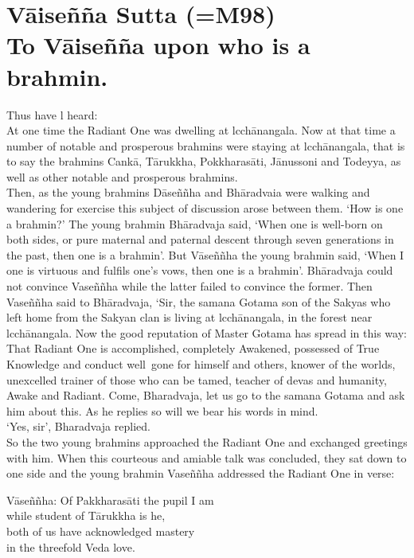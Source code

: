 \chapter{V\=aise\~n\~na Sutta (=M98)\\  To V\=aise\~n\~na upon who is a brahmin.}

 
 
Thus have l heard:\\
At one time the Radiant One was dwelling at lcch\=anangala. Now at that time a number of notable and prosperous brahmins were staying at lcch\=anangala, that is to say the brahmins Cank\=a, T\=arukkha, Pokkharas\=ati, J\=anussoni and Todeyya, as well as other notable and prosperous brahmins.\\

 Then, as the young brahmins D\=ase\~n\~nha and Bh\=aradvaia were walking and wandering for exercise this subject of discussion arose between them. `How is one a brahmin?' The young brahmin Bh\=aradvaja said, `When one is well-born on both sides, or pure maternal and paternal descent through seven generations in the past, then one is a brahmin'. But V\=ase\~n\~nha the young brahmin said, `When I one is virtuous and fulfils one's vows, then one is a brahmin'. Bh\=aradvaja could not convince Vase\~n\~nha while the latter failed to convince the former. Then Vase\~n\~nha said to Bh\=aradvaja, `Sir, the samana Gotama son of the Sakyas who left home from the Sakyan clan is living at lcch\=anangala, in the forest near lcch\=anangala. Now the good reputation of Master Gotama has spread in this way: That Radiant One is accomplished, completely Awakened, possessed of True Knowledge and conduct well~gone for himself and others, knower of the worlds, unexcelled trainer of those who can be tamed, teacher of devas and humanity, Awake and Radiant. Come, Bharadvaja, let us go to the samana Gotama and ask him about this. As he replies so will we bear his words in mind.\\

`Yes, sir', Bharadvaja replied.\\

So the two young brahmins approached the Radiant One and exchanged greetings with him. When this courteous and amiable talk was concluded, they sat down to one side and the young brahmin Vase\~n\~nha addressed the Radiant One in verse:

\begin{MyDescription}{V\=ase\~n\~nha:}
Of Pakkharas\=ati the pupil I am\\
while student of T\=arukkha is he,\\
both of us have acknowledged mastery\\
in the threefold Veda love.
\end{MyDescription}

